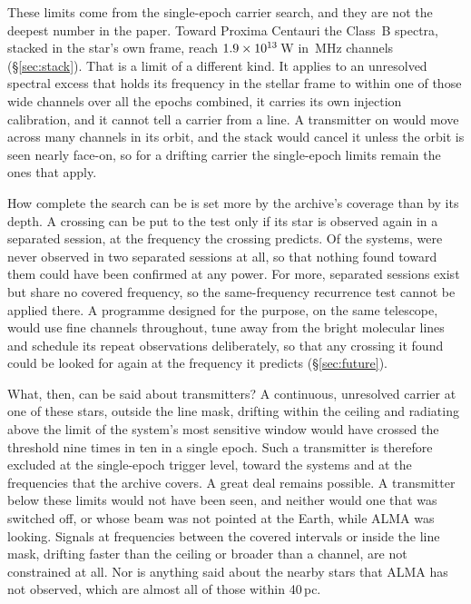 These limits come from the single-epoch carrier search, and they are not the
deepest number in the paper. Toward Proxima Centauri the Class~B spectra,
stacked in the star's own frame, reach $1.9\times10^{13}$\,W in
\ChanBModeMHz\,MHz channels (\S\ref{sec:stack}). That is a limit of a
different kind. It applies to an unresolved spectral excess that holds its
frequency in the stellar frame to within one of those wide channels over all
the epochs combined, it carries its own injection calibration, and it cannot
tell a carrier from a line. A transmitter on \PxPlanet{} would move across
many channels in its orbit, and the stack would cancel it unless the orbit
is seen nearly face-on, so for a drifting carrier the single-epoch limits
remain the ones that apply.

How complete the search can be is set more by the archive's coverage than by
its depth. A crossing can be put to the test only if its star is observed
again in a separated session, at the frequency the crossing predicts. Of the
\NSysClassA{} systems, \ZcNoRepNoSep{} were never observed in two separated
sessions at all, so that nothing found toward them could have been confirmed
at any power. For \ZcNoRepNoFreqWord{} more, separated sessions exist but
share no covered frequency, so the same-frequency recurrence test cannot be
applied there. A programme designed for the purpose, on the same telescope,
would use fine channels throughout, tune away from the bright molecular
lines and schedule its repeat observations deliberately, so that any
crossing it found could be looked for again at the frequency it predicts
(\S\ref{sec:future}).

What, then, can be said about transmitters? A continuous, unresolved carrier
at one of these stars, outside the line mask, drifting within the ceiling and
radiating above the limit of the system's most sensitive window would have
crossed the threshold nine times in ten in a single epoch. Such a
transmitter is therefore excluded at the single-epoch trigger level, toward
the systems and at the frequencies that the archive covers. A great deal
remains possible. A transmitter below these limits would not have been seen,
and neither would one that was switched off, or whose beam was not pointed
at the Earth, while ALMA was looking. Signals at frequencies between the
covered intervals or inside the line mask, drifting faster than the ceiling
or broader than a channel, are not constrained at all. Nor is anything said
about the nearby stars that ALMA has not observed, which are almost all of
those within 40\,pc.
